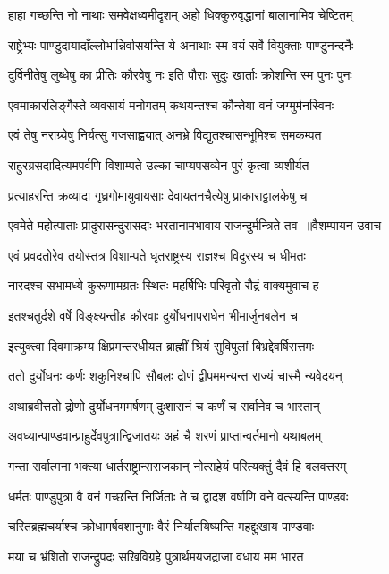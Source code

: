 \twolineshloka
{हाहा गच्छन्ति नो नाथाः समवेक्षध्वमीदृशम्}
{अहो धिक्कुरुवृद्धानां बालानामिव चेष्टितम्}


\twolineshloka
{राष्ट्रेभ्यः पाण्डुदायादाँल्लोभान्निर्वासयन्ति ये}
{अनाथाः स्म वयं सर्वे वियुक्ताः पाण्डुनन्दनैः}


\twolineshloka
{दुर्विनीतेषु लुब्धेषु का प्रीतिः कौरवेषु नः}
{इति पौराः सुदुः खार्ताः क्रोशन्ति स्म पुनः पुनः}


\twolineshloka
{एवमाकारलिङ्गैस्ते व्यवसायं मनोगतम्}
{कथयन्तश्च कौन्तेया वनं जग्मुर्मनस्विनः}


\twolineshloka
{एवं तेषु नराग्र्येषु निर्यत्सु गजसाह्वयात्}
{अनभ्रे विद्युतश्चासन्भूमिश्च समकम्पत}


\twolineshloka
{राहुरग्रसदादित्यमपर्वणि विशाम्पते}
{उल्का चाप्यपसव्येन पुरं कृत्वा व्यशीर्यत}


\twolineshloka
{प्रत्याहरन्ति क्रव्यादा गृध्रगोमायुवायसाः}
{देवायतनचैत्येषु प्राकाराट्टालकेषु च}


\twolineshloka
{एवमेते महोत्पाताः प्रादुरासन्दुरासदाः}
{भरतानामभावाय राजन्दुर्मन्त्रिते तव ॥वैशम्पायन उवाच}


\twolineshloka
{एवं प्रवदतोरेव तयोस्तत्र विशाम्पते}
{धृतराष्ट्रस्य राज्ञश्च विदुरस्य च धीमतः}


\twolineshloka
{नारदश्च सभामध्ये कुरूणामग्रतः स्थितः}
{महर्षिभिः परिवृतो रौद्रं वाक्यमुवाच ह}


\twolineshloka
{इतश्चतुर्दशे वर्षे विङ्क्ष्यन्तीह कौरवाः}
{दुर्योधनापराधेन भीमार्जुनबलेन च}


\twolineshloka
{इत्युक्त्वा दिवमाक्रम्य क्षिप्रमन्तरधीयत}
{ब्राह्मीं श्रियं सुविपुलां बिभ्रद्देवर्षिसत्तमः}


\twolineshloka
{ततो दुर्योधनः कर्णः शकुनिश्चापि सौबलः}
{द्रोणं द्वीपममन्यन्त राज्यं चास्मै न्यवेदयन्}


\twolineshloka
{अथाब्रवीत्ततो द्रोणो दुर्योधनममर्षणम्}
{दुःशासनं च कर्णं च सर्वानेव च भारतान्}


\twolineshloka
{अवध्यान्पाण्डवान्प्राहुर्देवपुत्रान्द्विजातयः}
{अहं चै शरणं प्राप्तान्वर्तमानो यथाबलम्}


\twolineshloka
{गन्ता सर्वात्मना भक्त्या धार्तराष्ट्रान्सराजकान्}
{नोत्सहेयं परित्यक्तुं दैवं हि बलवत्तरम्}


\twolineshloka
{धर्मतः पाण्डुपुत्रा वै वनं गच्छन्ति निर्जिताः}
{ते च द्वादश वर्षाणि वने वत्स्यन्ति पाण्डवः}


\twolineshloka
{चरितब्रह्मचर्याश्च क्रोधामर्षवशानुगाः}
{वैरं निर्यातयिष्यन्ति महद्दुःखाय पाण्डवाः}


\twolineshloka
{मया च भ्रंशितो राजन्द्रुपदः सखिविग्रहे}
{पुत्रार्थमयजद्राजा वधाय मम भारत}


